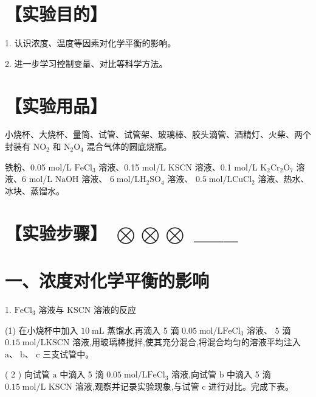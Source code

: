 \documentclass[10pt]{article}
\begin{document}
\section*{【实验目的】}

1. 认识浓度、温度等因素对化学平衡的影响。

2. 进一步学习控制变量、对比等科学方法。

\section*{【实验用品】}

小烧杯、大烧杯、量筒、试管、试管架、玻璃棒、胶头滴管、酒精灯、火柴、两个封装有 \({\mathrm{{NO}}}_{2}\) 和 \({\mathrm{N}}_{2}{\mathrm{O}}_{4}\) 混合气体的圆底烧瓶。

铁粉、0.05 mol/L \({\mathrm{{FeCl}}}_{3}\) 溶液、0.15 mol/L \(\mathrm{{KSCN}}\) 溶液、0.1 mol/L \({\mathrm{K}}_{2}{\mathrm{{Cr}}}_{2}{\mathrm{O}}_{7}\) 溶液、6 mol/L \(\mathrm{{NaOH}}\) 溶液、 \(6\mathrm{\;{mol}}/\mathrm{L}{\mathrm{H}}_{2}{\mathrm{{SO}}}_{4}\) 溶液、 \({0.5}\mathrm{\;{mol}}/\mathrm{L}{\mathrm{{CuCl}}}_{2}\) 溶液、热水、冰块、蒸馏水。

\section*{【实验步骤】 \(\bigotimes \bigotimes \bigotimes\) \_\_\_}

\section*{一、浓度对化学平衡的影响}

1. \({\mathrm{{FeCl}}}_{3}\) 溶液与 \(\mathrm{{KSCN}}\) 溶液的反应

(1) 在小烧杯中加入 \({10}\mathrm{\;{mL}}\) 蒸馏水,再滴入 5 滴 \({0.05}\mathrm{\;{mol}}/\mathrm{L}{\mathrm{{FeCl}}}_{3}\) 溶液、 5 滴 \({0.15}\mathrm{\;{mol}}/\mathrm{L}\mathrm{{KSCN}}\) 溶液,用玻璃棒搅拌,使其充分混合,将混合均匀的溶液平均注入 \(\mathrm{a}\text{、}\mathrm{\;b}\text{、}\) \(\mathrm{c}\) 三支试管中。

( 2 ) 向试管 \(\mathrm{a}\) 中滴入 5 滴 \({0.05}\mathrm{\;{mol}}/\mathrm{L}{\mathrm{{FeCl}}}_{3}\) 溶液,向试管 \(\mathrm{b}\) 中滴入 5 滴 \({0.15}\mathrm{\;{mol}}/\mathrm{L}\) \(\mathrm{{KSCN}}\) 溶液,观察并记录实验现象,与试管 \(\mathrm{c}\) 进行对比。完成下表。

\begin{center}
\end{center}
\end{document}
